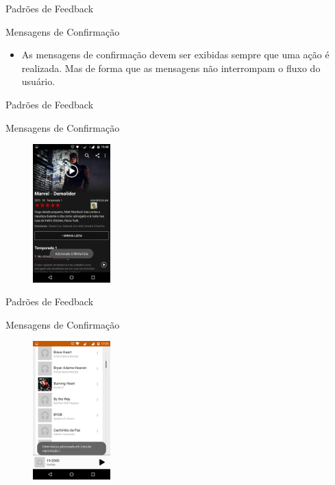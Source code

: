 \begin{frame}{Padrões de Feedback}
\begin{block}{Mensagens de Confirmação}
  \begin{itemize}
    \item<1-> As mensagens de confirmação devem ser exibidas sempre que uma ação é realizada. Mas de forma que as mensagens não interrompam o fluxo do usuário.
  \end{itemize}
\end{block}
\end{frame}

\begin{frame}{Padrões de Feedback}
\begin{block}{Mensagens de Confirmação}
    \begin{figure}
    \includegraphics[width=3cm]{figuras/confirm/confirm1}
    \end{figure}
\end{block}
\end{frame}

\begin{frame}{Padrões de Feedback}
\begin{block}{Mensagens de Confirmação}
    \begin{figure}
    \includegraphics[width=3cm]{figuras/confirm/confirm2}
    \end{figure}
\end{block}
\end{frame}

